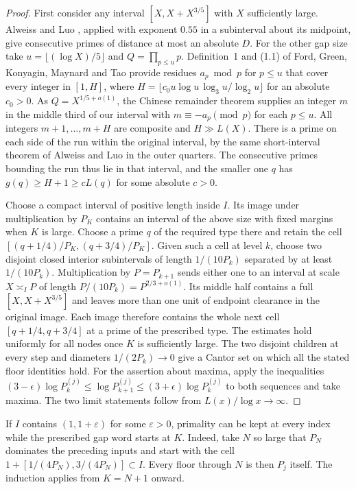 \documentclass[11pt]{article}
\theoremstyle{remark}\newtheorem*{remark}{Remark}
\begin{document}
\begin{proof}
First consider any interval $[X,X+X^{3/5}]$ with $X$ sufficiently
large. Alweiss and Luo \cite{alweiss}, applied with exponent $0.55$
in a subinterval about its midpoint, give consecutive primes of
distance at most an absolute $D$. For the other gap size take
$u=\lfloor(\log X)/5\rfloor$ and $Q=\prod_{p\le u}p$.
Definition~1 and (1.1) of Ford, Green, Konyagin, Maynard and Tao
\cite{fgkmt} provide residues $a_p\bmod p$ for $p\le u$ that
cover every integer in $[1,H]$, where
$H=\lfloor c_0 u\log u\,\log_3 u/\log_2 u\rfloor$
for an absolute $c_0>0$. As $Q=X^{1/5+o(1)}$, the Chinese remainder
theorem supplies an integer $m$ in the middle third of our interval
with $m\equiv-a_p\pmod p$ for each $p\le u$. All integers
$m+1,\ldots,m+H$ are composite and $H\gg L(X)$.
There is a prime on each side of the run within the original
interval, by the same short-interval theorem of Alweiss and Luo
in the outer quarters. The consecutive primes bounding the run
thus lie in that interval, and the smaller one $q$ has
$g(q)\ge H+1\ge cL(q)$ for some absolute $c>0$.

Choose a compact interval of positive length inside $I$.
Its image under multiplication by $P_K$ contains an interval of the
above size with fixed margins when $K$ is large.
Choose a prime $q$ of the required type there and retain the cell
$[(q+1/4)/P_K,(q+3/4)/P_K]$. Given such a cell at level $k$,
choose two disjoint closed interior subintervals of length
$1/(10P_k)$ separated by at least $1/(10P_k)$.
Multiplication by $P=P_{k+1}$ sends either one to an interval
at scale $X\asymp_I P$ of length
$P/(10P_k)=P^{2/3+o(1)}$. Its middle half contains a full
$[X,X+X^{3/5}]$ and leaves more than one unit of endpoint clearance
in the original image. Each image therefore contains the whole
next cell $[q+1/4,q+3/4]$ at a prime of the prescribed type.
The estimates hold uniformly for all nodes once $K$ is sufficiently
large. The two disjoint children at every step and diameters
$1/(2P_k)\to0$ give a Cantor set on which all the stated
floor identities hold. For the assertion about maxima, apply the
inequalities $(3-\epsilon)\log P_k^{(j)}\le\log P_{k+1}^{(j)}
\le(3+\epsilon)\log P_k^{(j)}$ to both sequences and take
maxima. The two limit statements follow from
$L(x)/\log x\to\infty$.
\end{proof}

If $I$ contains $(1,1+\varepsilon)$ for some $\varepsilon>0$,
primality can be kept at every index while the prescribed gap word
starts at $K$. Indeed, take $N$ so large that $P_N$ dominates the
preceding inputs and start with the cell
$1+[1/(4P_N),3/(4P_N)]\subset I$. Every floor through $N$ is then
$P_j$ itself. The induction applies from $K=N+1$ onward.
\end{document}
